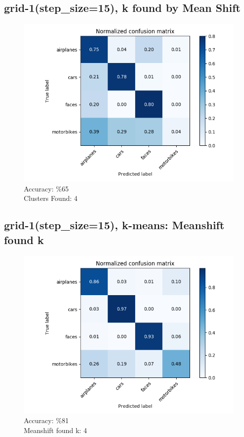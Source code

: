 \subsection*{grid-1(step\_size=15), k found by Mean Shift}
\begin{figure}[H]
    \centering
    \includegraphics[scale = 0.45]{images/confusion-stp-15-meanshift.png}
    \caption*{Accuracy: \%65 \\
              Clusters Found: 4}
\end{figure}

\subsection*{grid-1(step\_size=15), k-means: Meanshift found k}
\begin{figure}[H]
    \centering
    \includegraphics[scale = 0.45]{images/confusion-stp-15-kmeanshift.png}
    \caption*{Accuracy: \%81 \\
              Meanshift found k: 4}
\end{figure}

